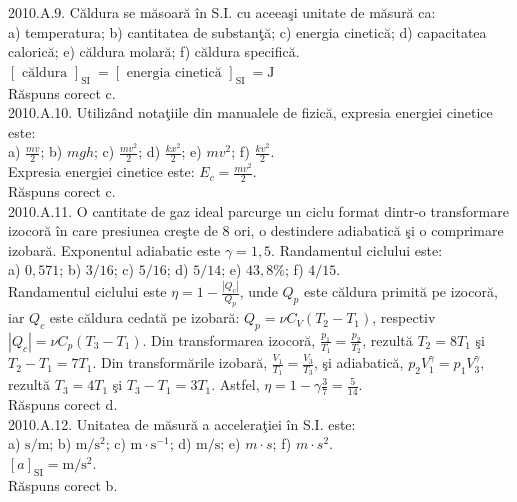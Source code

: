 2010.A.9. Căldura se măsoară în S.I. cu aceeaşi unitate de măsură ca:\\ a) temperatura; b) cantitatea de substanţă; c) energia cinetică; d) capacitatea calorică; e) căldura molară; f) căldura specifică.\\ $[\text { căldura }]_{\text {SI }}=[\text { energia cinetică }]_{\text {SI }}=\mathrm{J}$\\ Răspuns corect c.\\

2010.A.10. Utilizând notaţiile din manualele de fizică, expresia energiei cinetice este:\\ a) $\frac{m v}{2}$; b) $m g h$; c) $\frac{m v^{2}}{2}$; d) $\frac{k x^{2}}{2}$; e) $m v^{2}$; f) $\frac{k v^{2}}{2}$.\\ Expresia energiei cinetice este: $E_{c}=\frac{m v^{2}}{2}$.\\ Răspuns corect c.\\

2010.A.11. O cantitate de gaz ideal parcurge un ciclu format dintr-o transformare izocoră în care presiunea creşte de 8 ori, o destindere adiabatică şi o comprimare izobară. Exponentul adiabatic este $\gamma=1,5$. Randamentul ciclului este:\\ a) $0,571$; b) $3 / 16$; c) $5 / 16$; d) $5 / 14$; e) $43,8 \%$; f) $4 / 15$.\\ Randamentul ciclului este $\eta=1-\frac{\left|Q_{c}\right|}{Q_{p}}$, unde $Q_{p}$ este căldura primită pe izocoră, iar $Q_{c}$ este căldura cedată pe izobară: $Q_{p}=\nu C_{V}\left(T_{2}-T_{1}\right)$, respectiv $\left|Q_{c}\right|=\nu C_{p}\left(T_{3}-T_{1}\right)$. Din transformarea izocoră, $\frac{p_{1}}{T_{1}}=\frac{p_{2}}{T_{2}}$, rezultă $T_{2}=8 T_{1}$ şi $T_{2}-T_{1}=7 T_{1}$. Din transformările izobară, $\frac{V_{1}}{T_{1}}=\frac{V_{3}}{T_{3}}$, şi adiabatică, $p_{2} V_{1}^{\gamma}=p_{1} V_{3}^{\gamma}$, rezultă $T_{3}=4 T_{1}$ şi $T_{3}-T_{1}=3 T_{1}$. Astfel, $\eta=1-\gamma \frac{3}{7}=\frac{5}{14}$.\\ Răspuns corect d.\\

2010.A.12. Unitatea de măsură a acceleraţiei în S.I. este:\\ a) $\mathrm{s} / \mathrm{m}$; b) $\mathrm{m} / \mathrm{s}^{2}$; c) $\mathrm{m} \cdot \mathrm{s}^{-1}$; d) $\mathrm{m} / \mathrm{s}$; e) $m \cdot s$; f) $m \cdot s^{2}$.\\ $[a]_{\mathrm{SI}}=\mathrm{m} / \mathrm{s}^{2}$.\\ Răspuns corect b.\\

